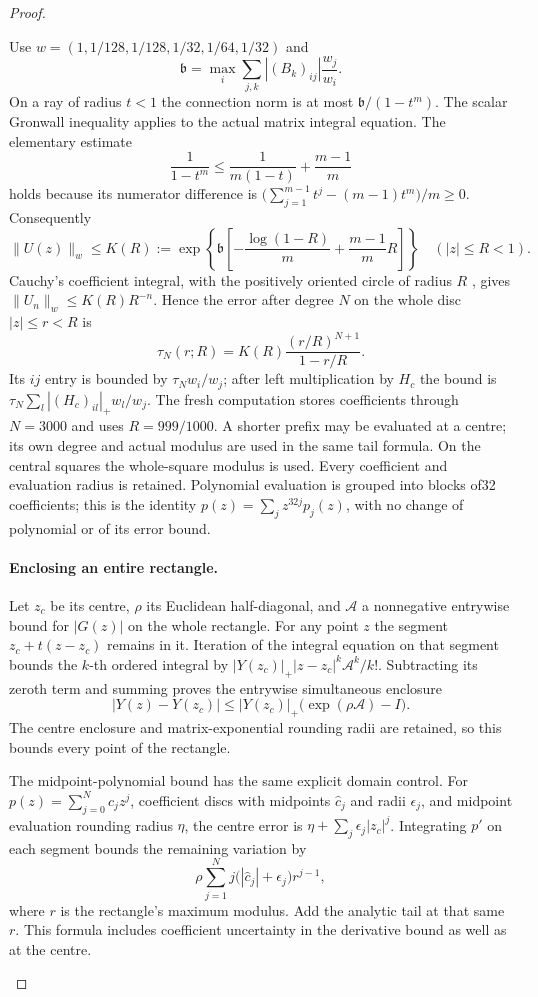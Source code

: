 \begin{proof}
\begin{enumerate}[label=\arabic*.]
Use $w=(1,1/128,1/128,1/32,1/64,1/32)$ and
\[
 \mathfrak b=\max_i\sum_{j,k}|(B_k)_{ij}|\frac{w_j}{w_i}.
\]
On a ray of radius $t<1$ the connection norm is at most
$\mathfrak b/(1-t^m)$. The scalar Gronwall inequality
\cite[Lemma~2.7, pp.~42--43]{TeschlODE2012} applies to the actual
matrix integral equation. The elementary estimate
\[
 \frac1{1-t^m}\le\frac1{m(1-t)}+\frac{m-1}{m}
\]
holds because its numerator difference is
$\bigl(\sum_{j=1}^{m-1}t^j-(m-1)t^m\bigr)/m\ge0$.
Consequently
\[
 \|U(z)\|_w\le K(R):=
 \exp\!\left\{\mathfrak b\left[-\frac{\log(1-R)}m
                 +\frac{m-1}{m}R\right]\right\}
 \quad (|z|\le R<1).
\]
Cauchy's coefficient integral, with the positively oriented circle
of radius $R$ \cite[\S1.9(iii), (1.9.30)--(1.9.31)]{DLMFCauchy2026},
gives $\|U_n\|_w\le K(R)R^{-n}$. Hence the error after degree $N$
on the whole disc $|z|\le r<R$ is
\[
 \tau_N(r;R)=K(R)\frac{(r/R)^{N+1}}{1-r/R}.\tag{1.18.3}
\]
Its $ij$ entry is bounded by $\tau_Nw_i/w_j$; after left
multiplication by $H_c$ the bound is
$\tau_N\sum_l|(H_c)_{il}|_+w_l/w_j$.
The fresh computation stores coefficients through $N=3000$ and
uses $R=999/1000$.  A shorter prefix may be evaluated at a centre;
its own degree and actual modulus are used in the same tail formula.
On the central squares the whole-square modulus is used.
Every coefficient and evaluation radius is retained. Polynomial
evaluation is grouped into blocks of32 coefficients; this is the
identity $p(z)=\sum_j z^{32j}p_j(z)$, with no change of polynomial
or of its error bound.

\paragraph{Enclosing an entire rectangle.}
Let $z_c$ be its centre, $\rho$ its Euclidean half-diagonal, and
$\mathcal A$ a nonnegative entrywise bound for $|G(z)|$ on the
whole rectangle. For any point $z$ the segment
$z_c+t(z-z_c)$ remains in it. Iteration of the integral equation
on that segment bounds the $k$-th ordered integral by
$|Y(z_c)|_+|z-z_c|^k\mathcal A^k/k!$. Subtracting its zeroth term
and summing proves the entrywise simultaneous enclosure
\[
 |Y(z)-Y(z_c)|
 \le |Y(z_c)|_+\bigl(\exp(\rho\mathcal A)-I\bigr).
\]
The centre enclosure and matrix-exponential rounding radii are
retained, so this bounds every point of the rectangle.

The midpoint-polynomial bound has the same explicit domain
control. For $p(z)=\sum_{j=0}^Nc_jz^j$, coefficient discs with
midpoints $\widehat c_j$ and radii $\epsilon_j$, and midpoint
evaluation rounding radius $\eta$, the centre error is
$\eta+\sum_j\epsilon_j|z_c|^j$. Integrating $p'$ on each segment
bounds the remaining variation by
\[
 \rho\sum_{j=1}^N j\bigl(|\widehat c_j|+\epsilon_j\bigr)r^{j-1},
\]
where $r$ is the rectangle's maximum modulus. Add the analytic
tail at that same $r$. This formula includes coefficient
uncertainty in the derivative bound as well as at the centre.


\end{enumerate}
\end{proof}
